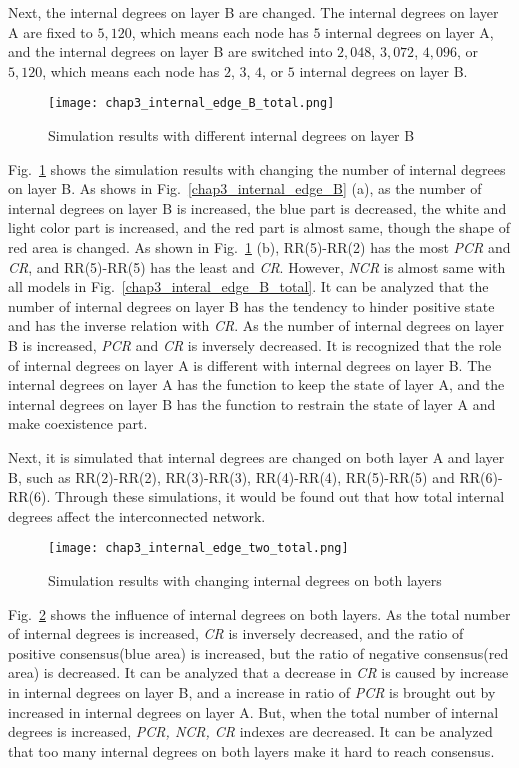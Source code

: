 Next, the internal degrees on layer B are changed. The internal degrees on layer A are fixed to  $5,120$, which means each node has $5$ internal degrees on layer A, and the internal degrees on layer B are switched into $2,048$, $3,072$, $4,096$, or $5,120$, which means each node has $2$, $3$, $4$, or $5$ internal degrees on layer B.  
\begin{figure}[!htb]
	\centering
	\texttt{[image: chap3\_internal\_edge\_B\_total.png]}
	\caption{Simulation results with different internal degrees on layer B}
	\label{chap3_internal_edge_B_total}
\end{figure}

Fig.~\ref{chap3_internal_edge_B_total} shows the simulation results with changing the number of internal degrees on layer B. As shows in Fig.~\ref{chap3_internal_edge_B} (a), as the number of internal degrees on layer B is increased, the blue part is decreased, the white and light color part is increased, and the red part is almost same, though the shape of red area is changed.  As shown in Fig.~\ref{chap3_internal_edge_B_total} (b), RR(5)-RR(2) has the most \textit{PCR} and \textit{CR}, and RR(5)-RR(5) has the least  and \textit{CR}. However, \textit{NCR} is almost same with all models in Fig.~\ref{chap3_interal_edge_B_total}. It can be analyzed that the number of internal degrees on layer B has the tendency to hinder positive state and has the inverse relation with \textit{CR}. As the number of internal degrees on layer B is increased, \textit{PCR} and \textit{CR} is inversely decreased. It is recognized that the role of internal degrees on layer A is different with internal degrees on layer B. The internal degrees on layer A has the function to keep the state of layer A, and the internal degrees on layer B has the function to restrain the state of layer A and make coexistence part. 

Next, it is simulated that internal degrees are changed on both layer A and layer B, such as RR(2)-RR(2), RR(3)-RR(3), RR(4)-RR(4), RR(5)-RR(5) and RR(6)-RR(6). Through these simulations, it would be found out that how total internal degrees affect the interconnected network.
\begin{figure}[!htb]
	\centering
	\texttt{[image: chap3\_internal\_edge\_two\_total.png]}
	\caption{Simulation results with changing internal degrees on both layers}
	\label{chap3_internal_edge_two_total}
\end{figure}

Fig.~\ref{chap3_internal_edge_two_total} shows the influence of internal degrees on both layers. As the total number of internal degrees is increased, \textit{CR} is inversely decreased, and the ratio of positive consensus(blue area) is increased, but the ratio of negative consensus(red area) is decreased. It can be analyzed that a decrease in \textit{CR} is caused by increase in internal degrees on layer B, and a increase in ratio of \textit{PCR} is brought out by increased in internal degrees on layer A. But, when the total number of internal degrees is increased, \textit{PCR, NCR, CR} indexes are decreased. It can be analyzed that too many internal degrees on both layers make it hard to reach consensus. 

